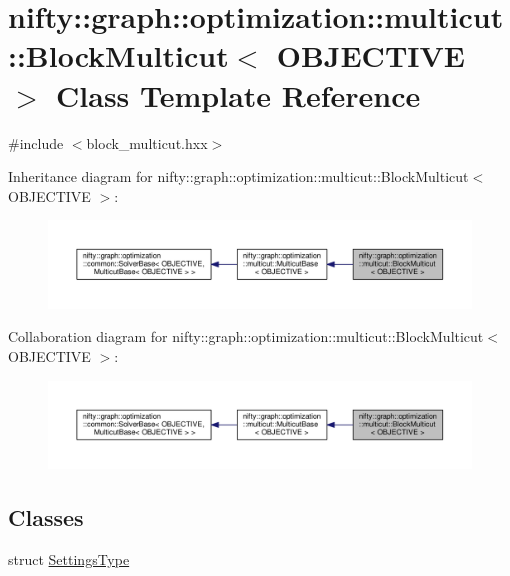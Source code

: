 \hypertarget{classnifty_1_1graph_1_1optimization_1_1multicut_1_1BlockMulticut}{}\section{nifty\+:\+:graph\+:\+:optimization\+:\+:multicut\+:\+:Block\+Multicut$<$ O\+B\+J\+E\+C\+T\+I\+V\+E $>$ Class Template Reference}
\label{classnifty_1_1graph_1_1optimization_1_1multicut_1_1BlockMulticut}


{\ttfamily \#include $<$block\+\_\+multicut.\+hxx$>$}



Inheritance diagram for nifty\+:\+:graph\+:\+:optimization\+:\+:multicut\+:\+:Block\+Multicut$<$ O\+B\+J\+E\+C\+T\+I\+V\+E $>$\+:\nopagebreak
\begin{figure}[H]
\begin{center}
\leavevmode
\includegraphics[width=350pt]{classnifty_1_1graph_1_1optimization_1_1multicut_1_1BlockMulticut__inherit__graph}
\end{center}
\end{figure}


Collaboration diagram for nifty\+:\+:graph\+:\+:optimization\+:\+:multicut\+:\+:Block\+Multicut$<$ O\+B\+J\+E\+C\+T\+I\+V\+E $>$\+:\nopagebreak
\begin{figure}[H]
\begin{center}
\leavevmode
\includegraphics[width=350pt]{classnifty_1_1graph_1_1optimization_1_1multicut_1_1BlockMulticut__coll__graph}
\end{center}
\end{figure}
\subsection*{Classes}
\begin{DoxyCompactItemize}
\item 
struct \hyperlink{structnifty_1_1graph_1_1optimization_1_1multicut_1_1BlockMulticut_1_1SettingsType}{Settings\+Type}
\end{DoxyCompactItemize}
